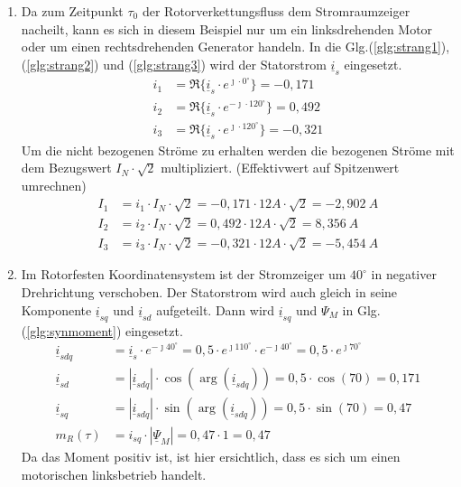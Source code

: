 \begin{solution}
\begin{enumerate}
\item  Da zum Zeitpunkt $\tau_0$ der Rotorverkettungsfluss dem Stromraumzeiger nacheilt, kann es sich in diesem Beispiel nur um ein linksdrehenden Motor oder um einen rechtsdrehenden Generator handeln. 
In die Glg.(\ref{glg:strang1}),(\ref{glg:strang2}) und (\ref{glg:strang3}) wird der Statorstrom $\underline{i}_s$ eingesetzt.
\begin{align}
i_1 & = \Re \{ \underline{i}_s \cdot e^{\jmath \cdot 0 ^\circ} \} = -0,171\\
i_2 & = \Re \{ \underline{i}_s \cdot e^{-\jmath \cdot 120 ^\circ} \} = 0,492 \\
i_3 & = \Re \{ \underline{i}_s \cdot e^{\jmath \cdot 120 ^\circ} \}=  -0,321
\end{align}
Um die nicht bezogenen Ströme zu erhalten werden die bezogenen Ströme mit dem Bezugswert $I_N \cdot \sqrt{2}$ multipliziert. (Effektivwert auf Spitzenwert umrechnen)
\begin{align}
I_1 & = i_1 \cdot I_N \cdot \sqrt{2} = -0,171 \cdot 12 A \cdot \sqrt{2} =-2,902~A \\
I_2 & = i_2 \cdot I_N \cdot \sqrt{2} = 0,492 \cdot 12 A \cdot \sqrt{2} =8,356~A \\
I_3 & = i_3 \cdot I_N \cdot \sqrt{2} =-0,321 \cdot 12 A \cdot \sqrt{2} =-5,454~A
\end{align}
\item Im Rotorfesten Koordinatensystem ist der Stromzeiger um $40^\circ$ in negativer Drehrichtung verschoben. Der Statorstrom wird auch gleich in seine Komponente $\underline{i}_{sq}$ und $\underline{i}_{sd}$ aufgeteilt. Dann wird $\underline{i}_{sq}$ und $\Psi_M$ in Glg.(\ref{glg:synmoment}) eingesetzt.
\begin{align}
\underline{i}_{sdq} & = \underline{i}_s \cdot e^{-\jmath 40 ^\circ} = 0,5 \cdot e^{\jmath 110 ^\circ} \cdot e^{-\jmath 40 ^\circ} = 0,5 \cdot e^{\jmath 70 ^\circ} \\
\underline{i}_{sd} & = |\underline{i}_{sdq}| \cdot \cos(\arg(\underline{i}_{sdq})) = 0,5 \cdot \cos(70) = 0,171 \\
\underline{i}_{sq} & = |\underline{i}_{sdq}| \cdot \sin(\arg(\underline{i}_{sdq})) = 0,5 \cdot \sin(70) = 0,47 \\
m_R(\tau)& =  i_{sq} \cdot | \underline{\Psi}_M|= 0,47\cdot 1 = 0,47
\end{align}
Da das Moment positiv ist, ist hier ersichtlich, dass es sich um einen motorischen linksbetrieb handelt.

\end{enumerate}
\end{solution}
